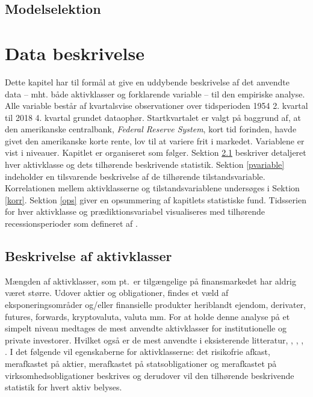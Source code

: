 \documentclass[
  a4paper,
  oneside]{memoir}
\begin{document}
\hypertarget{sekmodelselek}{%
\section{Modelselektion}\label{sekmodelselek}}

\hypertarget{kapiteldatab}{%
\chapter{Data beskrivelse}\label{kapiteldatab}}

Dette kapitel har til formål at give en uddybende beskrivelse af det anvendte data -- mht. både aktivklasser og forklarende variable -- til den empiriske analyse. Alle variable består af kvartalsvise observationer over tidsperioden 1954 2. kvartal til 2018 4. kvartal grundet dataophør. Startkvartalet er valgt på baggrund af, at den amerikanske centralbank, \emph{Federal Reserve System}, kort tid forinden, havde givet den amerikanske korte rente, lov til at variere frit i markedet. Variablene er vist i niveauer. Kapitlet er organiseret som følger. Sektion \ref{aktivklasser} beskriver detaljeret hver aktivklasse og dets tilhørende beskrivende statistik. Sektion \ref{pvariable} indeholder en tilsvarende beskrivelse af de tilhørende tilstandsvariable. Korrelationen mellem aktivklasserne og tilstandsvariablene undersøges i Sektion \ref{korr}. Sektion \ref{ops} giver en opsummering af kapitlets statistiske fund. Tidsserien for hver aktivklasse og prædiktionsvariabel visualiseres med tilhørende recessionsperioder som defineret af \citep{NBER2020}.

\hypertarget{aktivklasser}{%
\section{Beskrivelse af aktivklasser}\label{aktivklasser}}

Mængden af aktivklasser, som pt.~er tilgængelige på finansmarkedet har aldrig været større. Udover aktier og obligationer, findes et væld af eksponeringsområder og/eller finansielle produkter heriblandt ejendom, derivater, futures, forwards, kryptovaluta, valuta mm. For at holde denne analyse på et simpelt niveau medtages de mest anvendte aktivklasser for institutionelle og private investorer. Hvilket også er de mest anvendte i eksisterende litteratur, \citep{CampVic2003, CampVic1999}, \citep{JurVic2011}, \citep{Engsted2012}, \citep{CampVicCha2003}. I det følgende vil egenskaberne for aktivklasserne: det risikofrie afkast, merafkastet på aktier, merafkastet på statsobligationer og merafkastet på virksomhedsobligationer beskrives og derudover vil den tilhørende beskrivende statistik for hvert aktiv belyses.
\end{document}

